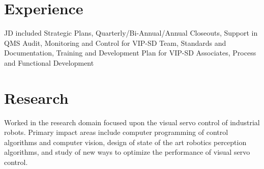\documentclass[a4paper]{deedy-resume} %
\begin{document}
\begin{minipage}[t]{0.66\textwidth} %


\section{Experience}


\vspace{\topsep} %
\begin{tightitemize}
\item JD included Strategic Plans, Quarterly/Bi-Annual/Annual Closeouts, Support in QMS Audit, Monitoring and Control for VIP-SD Team, Standards and Documentation, Training and Development Plan for VIP-SD Associates, Process and Functional Development
\end{tightitemize}

\sectionspace %


\section{Research}


Worked in the research domain focused upon the visual servo control of industrial robots. Primary impact areas include computer programming of control algorithms and computer vision, design of state of the art robotics perception algorithms, and study of new ways to optimize the performance of visual servo control. 

\sectionspace %




\end{minipage}
\end{document}
